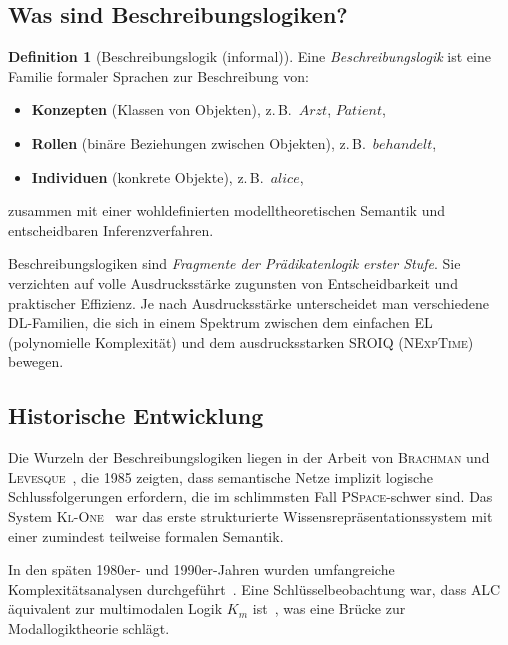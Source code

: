 ﻿\documentclass[a4paper,12pt]{article}
\theoremstyle{definition}
\newtheorem{definition}{Definition}[section]
\theoremstyle{plain}
\theoremstyle{remark}
\begin{document}
\subsection{Was sind Beschreibungslogiken?}

\begin{definition}[Beschreibungslogik (informal)]
Eine \emph{Beschreibungslogik} ist eine Familie formaler Sprachen
zur Beschreibung von:
\begin{itemize}
  \item \textbf{Konzepten} (Klassen von Objekten), z.\,B.\ $\mathit{Arzt}$,
        $\mathit{Patient}$,
  \item \textbf{Rollen} (bin{\"{a}}re Beziehungen zwischen Objekten),
        z.\,B.\ $\mathit{behandelt}$,
  \item \textbf{Individuen} (konkrete Objekte), z.\,B.\ $\mathit{alice}$,
\end{itemize}
zusammen mit einer wohldefinierten modelltheoretischen Semantik und
entscheidbaren Inferenzverfahren.
\end{definition}

Beschreibungslogiken sind \emph{Fragmente der Pr{\"{a}}dikatenlogik erster Stufe}.
Sie verzichten auf volle Ausdrucksst{\"{a}}rke zugunsten von Entscheidbarkeit
und praktischer Effizienz. Je nach Ausdrucksst{\"{a}}rke unterscheidet man
verschiedene DL-Familien, die sich in einem Spektrum zwischen
dem einfachen \textsf{EL} (polynomielle Komplexit{\"{a}}t) und dem
ausdrucksstarken \textsf{SROIQ} (\textsc{NExpTime}) bewegen.

\subsection{Historische Entwicklung}

Die Wurzeln der Beschreibungslogiken liegen in der Arbeit von
\textsc{Brachman} und \textsc{Levesque}~\cite{Brachman1985},
die 1985 zeigten, dass semantische Netze implizit logische
Schlussfolgerungen erfordern, die im schlimmsten Fall \textsc{PSpace}-schwer sind.
Das System \textsc{Kl-One}~\cite{Brachman1979} war das erste strukturierte
Wissensrepr{\"{a}}sentationssystem mit einer zumindest teilweise formalen Semantik.

In den sp{\"{a}}ten 1980er- und 1990er-Jahren wurden umfangreiche
Komplexit{\"{a}}tsanalysen durchgef{\"{u}}hrt~\cite{Donini1997, Schmidt1991}.
Eine Schl{\"{u}}sselbeobachtung war, dass \textsf{ALC} {\"{a}}quivalent zur
multimodalen Logik $K_m$ ist~\cite{Schmidt1991}, was eine Br{\"{u}}cke
zur Modallogiktheorie schl{\"{a}}gt.
\end{document}
